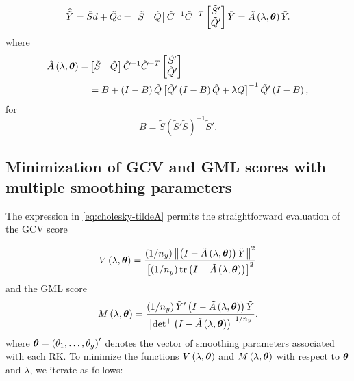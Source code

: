 \documentclass[12pt]{article}
\newcommand{\bftheta}{\mbox{\boldmath $\theta$}}
\newcommand{\tildeS}{\tilde{S}}
\newcommand{\tildeY}{\tilde{Y}}
\newcommand{\tildeQ}{\tilde{Q}}
\newcommand{\tildeA}{\tilde{A}}
\theoremstyle{definition}
\begin{document}
\begin{equation} \label{eq:tildeY-hat-equals-tildeA-tildeY}
\widehat{\tildeY} = \tildeS d + \tildeQ c = \begin{bmatrix} \tildeS & \tildeQ \end{bmatrix} \tilde{C}^{-1} \tilde{C}^{-T} \begin{bmatrix} \tildeS' \\ \tildeQ' \end{bmatrix} \tildeY = \tildeA\left(\lambda, \bftheta\right) \tildeY.
\end{equation} 
\noindent
where
\begin{align}
\begin{split} \label{eq:cholesky-tildeA}
\tildeA\left(\lambda, \bftheta \right) =& \begin{bmatrix} \tildeS & \tildeQ \end{bmatrix} \tilde{C}^{-1} \tilde{C}^{-T} \begin{bmatrix} \tildeS' \\ \tildeQ' \end{bmatrix}  \\
&= B + \left(I - B\right) \tildeQ \left[\tildeQ'\left( I - B \right)\tildeQ + \lambda Q\right]^{-1} \tildeQ'\left(I - B\right),
\end{split}
\end{align} 
\noindent
for
\[
B = \tildeS\left(\tildeS' \tildeS \right)^{-1}\tildeS'.
\]


\subsection{Minimization of GCV and GML scores with multiple smoothing parameters}

The expression in \ref{eq:cholesky-tildeA} permits the straightforward evaluation of the GCV score

\begin{equation} \label{eq:general-GCV-score}
V\left(\lambda, \bftheta \right) = \frac{\left( 1/n_y \right)  \left \lVert \left(I - \tildeA\left(\lambda, \bftheta \right)\right) \tildeY \right\rVert^2}{\left[\left( 1/n_y \right) \textup{tr} \left(I - \tildeA\left(\lambda, \bftheta \right)\right)  \right]^2}
\end{equation}
\noindent
and the GML score
\begin{equation} \label{eq:general-GML-score}
M\left(\lambda, \bftheta \right) = \frac{\left( 1/n_y \right) \tildeY' \left(I - \tildeA\left(\lambda, \bftheta \right)\right) \tildeY }{\left[ \mbox{det}^+\left(I - \tildeA\left(\lambda, \bftheta \right)\right)  \right]^{1/n_y}}.
\end{equation}
\noindent
where $\bftheta = \left(\theta_1,\dots, \theta_g\right)'$ denotes the vector of smoothing parameters associated with each RK.
\bigskip
To minimize the functions $V\left(\lambda, \bftheta\right)$ and $M\left(\lambda, \bftheta\right)$ with respect to $\bftheta$ and $\lambda$, we iterate as follows:
\end{document}
